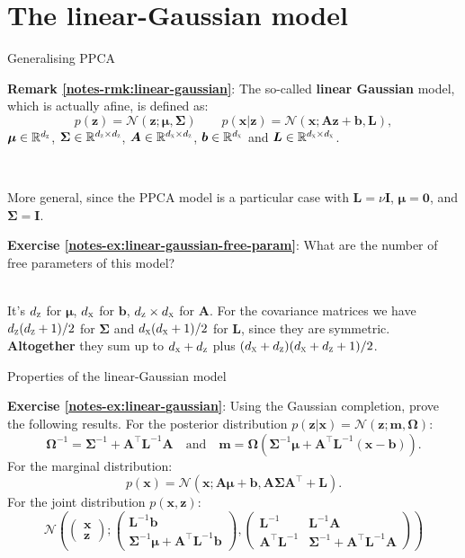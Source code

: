 \documentclass{beamer}
\newcommand{\bs}[1]{\boldsymbol{#1}}
\newcommand{\exercise}[2]{\noindent\colorbox{blue!10}{\parbox{0.995\textwidth}{\textbf{Exercise \ref{notes-ex:#1}}: #2}}\\}
\newcommand{\remark}[2]{\noindent\colorbox{red!10}{\parbox{0.995\textwidth}{\textbf{Remark \ref{notes-rmk:#1}}: #2}}\\}
\begin{document}
\section{The linear-Gaussian model}

\begin{frame}{Generalising PPCA}
\remark{linear-gaussian}{The so-called \textbf{linear Gaussian} model, which is actually afine, is defined as:
 \[
  p(\bs{z}) = \mathcal{N}(\bs{z};\bs{\mu},\bs{\Sigma}) \qquad 
  p(\bs{x}|\bs{z}) = \mathcal{N}(\bs{x};\bs{A}\bs{z}+\bs{b},\bs{L}),
 \]
 $\bs{\mu}\in\mathbb{R}^{d_{\textsc{z}}}$, $\bs{\Sigma}\in\mathbb{R}^{d_{\textsc{z}}\times d_{\textsc{z}}}$, $\bs{A}\in\mathbb{R}^{d_{\textsc{x}}\times d_{\textsc{z}}}$, $\bs{b}\in\mathbb{R}^{d_{\textsc{x}}}$ and $\bs{L}\in\mathbb{R}^{d_{\textsc{x}}\times d_{\textsc{x}}}$. 
}\vspace{5mm}

More general, since the PPCA model is a particular case with $\bs{L}=\nu\bs{I}$, $\bs{\mu}=\bs{0}$, and $\bs{\Sigma}=\bs{I}$.\vspace{5mm}

\exercise{linear-gaussian-free-param}{What are the number of free parameters of this model?}\vspace{2mm}\pause It's $d_{\textsc{z}}$ for $\bs{\mu}$, $d_{\textsc{x}}$ for $\bs{b}$, $d_{\textsc{z}}\times d_{\textsc{x}}$ for $\bs{A}$. For the covariance matrices we have $d_{\textsc{z}}(d_{\textsc{z}}+1)/2$ for $\bs{\Sigma}$ and $d_{\textsc{x}}(d_{\textsc{x}}+1)/2$ for $\bs{L}$, since they are symmetric.\vspace{2mm}\\
\textbf{Altogether} they sum up to $d_{\textsc{x}}+d_{\textsc{z}}$ plus $(d_{\textsc{x}}+d_{\textsc{z}})(d_{\textsc{x}}+d_{\textsc{z}}+1)/2$.
\end{frame}

\begin{frame}{Properties of the linear-Gaussian model}
\exercise{linear-gaussian}{Using the Gaussian completion, prove the following results. For the posterior distribution $p(\bs{z}|\bs{x}) = \mathcal{N}(\bs{z};\bs{m},\bs{\Omega})$:
\[
 \bs{\Omega}^{-1} = \bs{\Sigma}^{-1}+\bs{A}^\top\bs{L}^{-1}\bs{A} \quad\text{and}\quad \bs{m}=\bs{\Omega}(\bs{\Sigma}^{-1}\bs{\mu}+\bs{A}^\top\bs{L}^{-1}(\bs{x}-\bs{b})). 
\]
For the marginal distribution:
\[
 p(\bs{x}) = \mathcal{N}(\bs{x};\bs{A}\bs{\mu}+\bs{b},\bs{A}\bs{\Sigma}\bs{A}^\top + \bs{L}).
\]
For the joint distribution $p(\bs{x},\bs{z})$:
\[
 \mathcal{N} \left(\left(\begin{array}{c}\bs{x}\\\bs{z}\end{array}\right); \left(\begin{array}{c}\bs{L}^{-1}\bs{b}\\\bs{\Sigma}^{-1}\bs{\mu}+\bs{A}^\top\bs{L}^{-1}\bs{b}\end{array}\right),\left(\begin{array}{cc}\bs{L}^{-1} & \bs{L}^{-1}\bs{A}\\\bs{A}^\top\bs{L}^{-1} & \bs{\Sigma}^{-1}+\bs{A}^\top\bs{L}^{-1}\bs{A}\end{array}\right)\right)
\]
}
\end{frame}
\end{document}
